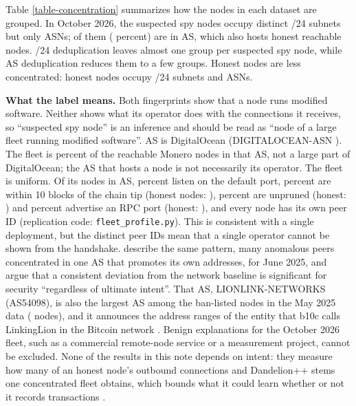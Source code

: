 \documentclass[english]{mrl}
\theoremstyle{plain}
\begin{document}
\bigskip

Table \ref{table-concentration} summarizes how the nodes in each dataset are grouped. In October 2026, the \nSpyNew{} suspected spy nodes occupy \spyTwentyFourNew{} distinct /24 subnets but only \spyAsnNew{} ASNs; \spyTopAsnNNew{} of them (\spyTopAsnPctNew{} percent) are in AS\spyTopAsnNew{}, which also hosts \honestInSpyTopAsnNew{} honest reachable nodes. /24 deduplication leaves almost one group per suspected spy node, while AS deduplication reduces them to a few groups. Honest nodes are less concentrated: \nHonestNew{} honest nodes occupy \hTwentyFourNew{} /24 subnets and \hAsnNew{} ASNs.

\textbf{What the label means.} Both fingerprints show that a node runs modified software. Neither shows what its operator does with the connections it receives, so ``suspected spy node'' is an inference and should be read as ``node of a large fleet running modified software''. AS\spyTopAsnNew{} is DigitalOcean (DIGITALOCEAN-ASN \cite{IPtoASN}). The fleet is \spyShareOfTopAsn{} percent of the reachable Monero nodes in that AS, not a large part of DigitalOcean; the AS that hosts a node is not necessarily its operator. The fleet is uniform. Of its \fpDoN{} nodes in AS\spyTopAsnNew{}, \fpDoPort{} percent listen on the default port, \fpDoTip{} percent are within 10 blocks of the chain tip (honest nodes: \fpHonTip{}), \fpDoUnpruned{} percent are unpruned (honest: \fpHonUnpruned{}) and \fpDoRpc{} percent advertise an RPC port (honest: \fpHonRpc{}), and every node has its own peer ID (replication code: \texttt{fleet\_profile.py}). This is consistent with a single deployment, but the distinct peer IDs mean that a single operator cannot be shown from the handshake. \cite{Kopyciok2026} describe the same pattern, many anomalous peers concentrated in one AS that promotes its own addresses, for June 2025, and argue that a consistent deviation from the network baseline is significant for security ``regardless of ultimate intent''. That AS, LIONLINK-NETWORKS (AS54098), is also the largest AS among the ban-listed nodes in the May 2025 data (\spyTopAsnNOld{} nodes), and it announces the address ranges of the entity that b10c calls LinkingLion in the Bitcoin network \cite{b10c2024}. Benign explanations for the October 2026 fleet, such as a commercial remote-node service or a measurement project, cannot be excluded. None of the results in this note depends on intent: they measure how many of an honest node's outbound connections and Dandelion++ stems one concentrated fleet obtains, which bounds what it could learn whether or not it records transactions \cite{Fanti2018a,Sharma2022}.
\end{document}
